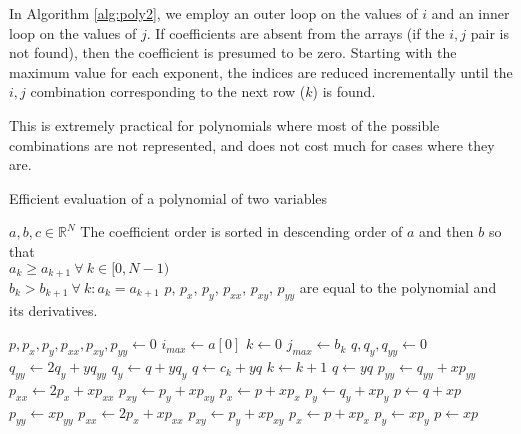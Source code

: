 \documentclass[twocolumn,letterpaper,11pt]{article}
\begin{document}
In Algorithm \ref{alg:poly2}, we employ an outer loop on the values of $i$ and an inner loop on the values of $j$.  If coefficients are absent from the arrays (if the $i,j$ pair is not found), then the coefficient is presumed to be zero.  Starting with the maximum value for each exponent, the indices are reduced incrementally until the $i,j$ combination corresponding to the next row ($k$) is found.

This is extremely practical for polynomials where most of the possible combinations are not represented, and does not cost much for cases where they are.

\begin{algorithm}
\caption{Efficient evaluation of a polynomial of two variables}\label{alg:poly2}
\begin{algorithmic}[1]
\REQUIRE $a,b,c \in \mathbb{R}^N$
\REQUIRE The coefficient order is sorted in descending order of $a$ and then $b$ so that\\
$a_k \ge a_{k+1}\ \forall\ k \in [0,N-1)$\\
$b_k > b_{k+1}\ \forall\ k : a_k = a_{k+1}$
\ENSURE $p$, $p_x$, $p_y$, $p_{xx}$, $p_{xy}$, $p_{yy}$ are equal to the polynomial and its derivatives.

\STATE $p, p_x, p_y, p_{xx}, p_{xy}, p_{yy} \leftarrow 0$
\STATE $i_{max} \leftarrow a[0]$
\STATE $k \leftarrow 0$
        \STATE $j_{max} \leftarrow b_k$
        \STATE $q,q_y,q_{yy} \leftarrow 0$
            \STATE $q_{yy} \leftarrow 2 q_y + y q_{yy}$
            \STATE $q_y \leftarrow q + y q_y$
                \STATE $q \leftarrow c_k + y q$
                \STATE $k \leftarrow k+1$
            \ELSE
                \STATE $q \leftarrow y q$
            \ENDIF
        \ENDFOR
        \STATE $p_{yy} \leftarrow q_{yy} + x p_{yy}$
        \STATE $p_{xx} \leftarrow 2 p_x + x p_{xx}$
        \STATE $p_{xy} \leftarrow p_y + x p_{xy}$
        \STATE $p_x \leftarrow p + x p_x$
        \STATE $p_y \leftarrow q_y + x p_y$
        \STATE $p \leftarrow q + x p$
    \ELSE
        \STATE $p_{yy} \leftarrow x p_{yy}$
        \STATE $p_{xx} \leftarrow 2 p_x + x p_{xx}$
        \STATE $p_{xy} \leftarrow p_y + x p_{xy}$
        \STATE $p_x \leftarrow p + x p_x$
        \STATE $p_y \leftarrow x p_y$
        \STATE $p \leftarrow x p$
    \ENDIF
\ENDFOR
\end{algorithmic}
\end{algorithm}
\end{document}
